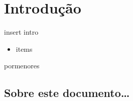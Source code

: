 \chapter{Introdução}
insert intro
\begin{itemize}
        \item items
\end{itemize}

pormenores

\section{Sobre este documento\ldots}

